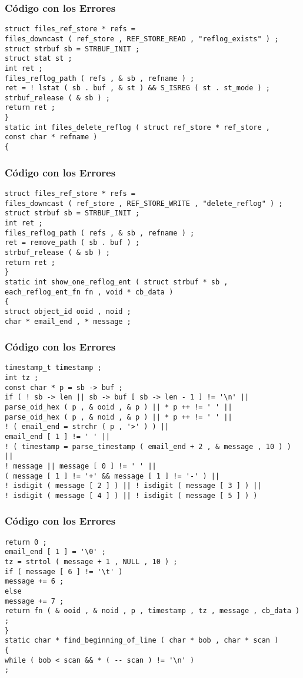 \documentclass{beamer}
\begin{document}
\begin{frame}[fragile]
\frametitle{C\'odigo con los Errores}
\begin{verbatim}
struct files_ref_store * refs = 
files_downcast ( ref_store , REF_STORE_READ , "reflog_exists" ) ; 
struct strbuf sb = STRBUF_INIT ; 
struct stat st ; 
int ret ; 
files_reflog_path ( refs , & sb , refname ) ; 
ret = ! lstat ( sb . buf , & st ) && S_ISREG ( st . st_mode ) ; 
strbuf_release ( & sb ) ; 
return ret ; 
} 
static int files_delete_reflog ( struct ref_store * ref_store , 
const char * refname ) 
{ 
\end{verbatim}
\end{frame}
\begin{frame}[fragile]
\frametitle{C\'odigo con los Errores}
\begin{verbatim}
struct files_ref_store * refs = 
files_downcast ( ref_store , REF_STORE_WRITE , "delete_reflog" ) ; 
struct strbuf sb = STRBUF_INIT ; 
int ret ; 
files_reflog_path ( refs , & sb , refname ) ; 
ret = remove_path ( sb . buf ) ; 
strbuf_release ( & sb ) ; 
return ret ; 
} 
static int show_one_reflog_ent ( struct strbuf * sb , each_reflog_ent_fn fn , void * cb_data ) 
{ 
struct object_id ooid , noid ; 
char * email_end , * message ; 
\end{verbatim}
\end{frame}
\begin{frame}[fragile]
\frametitle{C\'odigo con los Errores}
\begin{verbatim}
timestamp_t timestamp ; 
int tz ; 
const char * p = sb -> buf ; 
if ( ! sb -> len || sb -> buf [ sb -> len - 1 ] != '\n' || 
parse_oid_hex ( p , & ooid , & p ) || * p ++ != ' ' || 
parse_oid_hex ( p , & noid , & p ) || * p ++ != ' ' || 
! ( email_end = strchr ( p , '>' ) ) || 
email_end [ 1 ] != ' ' || 
! ( timestamp = parse_timestamp ( email_end + 2 , & message , 10 ) ) || 
! message || message [ 0 ] != ' ' || 
( message [ 1 ] != '+' && message [ 1 ] != '-' ) || 
! isdigit ( message [ 2 ] ) || ! isdigit ( message [ 3 ] ) || 
! isdigit ( message [ 4 ] ) || ! isdigit ( message [ 5 ] ) ) 
\end{verbatim}
\end{frame}
\begin{frame}[fragile]
\frametitle{C\'odigo con los Errores}
\begin{verbatim}
return 0 ; 
email_end [ 1 ] = '\0' ; 
tz = strtol ( message + 1 , NULL , 10 ) ; 
if ( message [ 6 ] != '\t' ) 
message += 6 ; 
else 
message += 7 ; 
return fn ( & ooid , & noid , p , timestamp , tz , message , cb_data ) ; 
} 
static char * find_beginning_of_line ( char * bob , char * scan ) 
{ 
while ( bob < scan && * ( -- scan ) != '\n' ) 
; 
\end{verbatim}
\end{frame}
\end{document}
